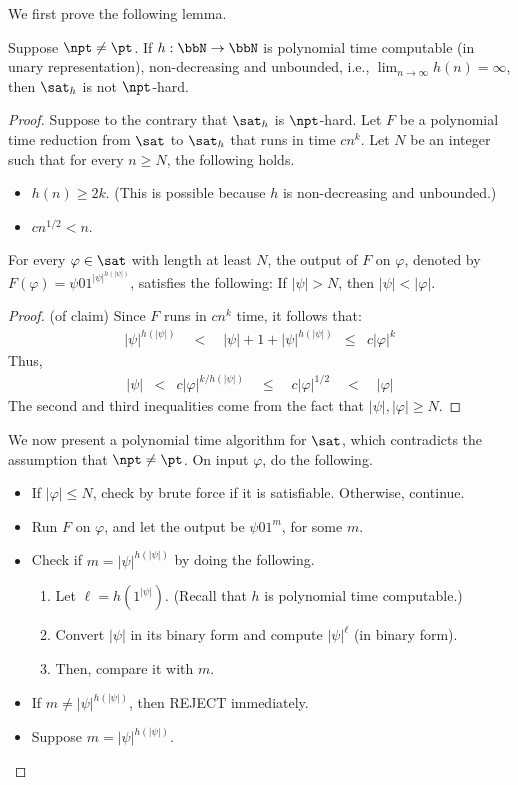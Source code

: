 \documentclass[11pt, a4paper]{article}
\begin{document}
We first prove the following lemma.
\begin{lemma}
\label{lem:ladner-a}
Suppose $\npt\neq \pt$.
If $h:\bbN\to\bbN$ is polynomial time computable (in unary representation),
non-decreasing and unbounded, i.e., $\lim_{n\to\infty} h(n)=\infty$,
then $\sat_h$ is not $\npt$-hard.
\end{lemma}
\begin{proof}
Suppose to the contrary that $\sat_h$ is $\npt$-hard.
Let $F$ be a polynomial time reduction from $\sat$ to $\sat_h$ that runs in time $cn^k$.
Let $N$ be an integer such that for every $n\geq N$, the following holds.
\begin{itemize}\itemsep=0pt
\item
$h(n)\geq 2k$. (This is possible because $h$ is non-decreasing and unbounded.)
\item
$cn^{1/2} < n$.
\end{itemize}

\begin{claim}
\label{cl:ladner}
For every $\varphi\in\sat$ with length at least $N$, the output of $F$ on $\varphi$,
denoted by $F(\varphi) =\psi01^{|\psi|^{h(|\psi|)}}$, satisfies the following:
If $|\psi|> N$, then $|\psi|<|\varphi|$.
\end{claim}
\begin{proof}(of claim)
Since $F$ runs in $cn^k$ time, it follows that:
\begin{eqnarray*}
|\psi|^{h(|\psi|)} \quad < \quad
|\psi| + 1 + |\psi|^{h(|\psi|)} & \leq & c |\varphi|^k
\end{eqnarray*}
Thus, 
\begin{eqnarray*}
|\psi| & < & c|\varphi|^{k/h(|\psi|)}
\quad \leq \quad 
c|\varphi|^{1/2}
\quad < \quad
|\varphi|
\end{eqnarray*}
The second and third inequalities come from the fact that $|\psi|,|\varphi|\geq N$.
\end{proof}

We now present a polynomial time algorithm for $\sat$, which contradicts the assumption that $\npt\neq \pt$.
On input $\varphi$, do the following.
\begin{itemize}
\item
If $|\varphi|\leq N$, check by brute force if it is satisfiable.
Otherwise, continue.
\item
Run $F$ on $\varphi$, and let the output be $\psi01^m$, for some $m$.
\item
Check if $m=|\psi|^{h(|\psi|)}$ by doing the following.
\begin{enumerate}\itemsep=0pt
\item
Let $\ell = h(1^{|\psi|})$. (Recall that $h$ is polynomial time computable.)
\item
Convert $|\psi|$ in its binary form and compute $|\psi|^{\ell}$ (in binary form).
\item
Then, compare it with $m$.
\end{enumerate}
\item
If $m \neq |\psi|^{h(|\psi|)}$, then REJECT immediately.
\item
Suppose $m = |\psi|^{h(|\psi|)}$.


\end{itemize}
\end{proof}
\end{document}
